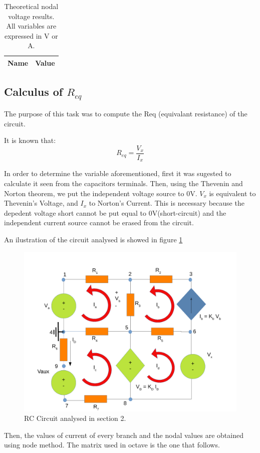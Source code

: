 \begin{table}[ht]
  \centering
  \begin{tabular}{|l|r|}
    \hline    
    {\bf Name} & {\bf Value} \\ \hline
    
  \end{tabular}
  \caption{Theoretical nodal voltage results. All variables are expressed in V or A.}
  \label{tab:p2}
\end{table}


\subsection{Calculus of $R_{eq}$}
\label{subsection:2.2}

\par The purpose of this task was to compute the Req (equivalant resistance) of the circuit.

It is known that:
\begin{equation}
R_{eq}=\frac{V_{x}}{I_{x}}
\end{equation}

In order to determine the variable aforementioned, first it was sugested to calculate it seen from the capacitors terminals. Then, using the Thevenin and Norton theorem, we put the independent voltage source to 0V. $V_{x}$ is equivalent to Thevenin's Voltage, and $I_{x}$ to Norton's Current. This is necessary because the depedent voltage short cannot be put equal to 0V(short-circuit) and the independent current source cannot be erased from the circuit.
\par An ilustration of the circuit analysed is showed in figure \ref{sim2draw} 
\begin{figure}[h] \centering
\includegraphics[width=0.65\linewidth]{sim2draw.pdf}
\caption{RC Circuit analysed in section 2.}
\label{sim2draw}
\end{figure}
\par
Then, the values of current of  every branch and the nodal values are obtained using node method. The matrix used in octave is the one that follows.


